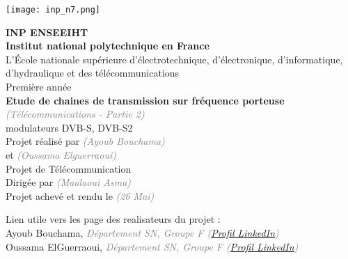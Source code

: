 \documentclass[11pt]{article}
\newcommand{\Gray}[1]{\textcolor{gray}{\textit{#1}}}
\begin{document}
\pagestyle{fancy}
\fancyhf{} %
\renewcommand{\headrulewidth}{0.4pt} %
\fancyfoot[C]{\thepage} %
\renewcommand{\footrulewidth}{0.4pt} %


\hfill
\texttt{[image: inp\_n7.png]}

\vspace*{8mm}

\begin{center}
\LARGE
{\bfseries
INP ENSEEIHT\\[2mm]
Institut national polytechnique en France\\[3mm]
}
\large 
L'École nationale supérieure d'électrotechnique, d'électronique, d'informatique, d'hydraulique et des télécommunications \\[2mm]
Première année\\[10mm]
\Huge
{\bfseries Etude de chaines de transmission sur fréquence porteuse
}\\
\Gray{\LARGE (Télécommunications - Partie 2)}\\[6mm]
\huge 
modulateurs DVB-S, DVB-S2\\[8mm]

\Large 
Projet réalisé par \Gray{(Ayoub Bouchama)} \\[1mm]
et \Gray{(Oussama Elguerraoui)} \\[6mm]
Projet de Télécommunication \\[6mm]
Dirigée par  \Gray{(Maalaoui Asma)}\\[8mm]
Projet achevé et rendu le \Gray{(26 Mai)}\\[10mm]

\end{center}

Lien utile vers les page des realisateurs du projet :\\[3mm]
Ayoub Bouchama, \Gray{Département SN, Groupe F (\href{https://www.linkedin.com/in/ayoubbouchama/}{Profil LinkedIn}) }\\
Oussama ElGuerraoui, \Gray{Département SN, Groupe F (\href{https://www.linkedin.com/in/oussama-elguerraoui-4770b51aa/}{Profil LinkedIn}) }\\

\newpage
\parskip 7pt

\end{document}
